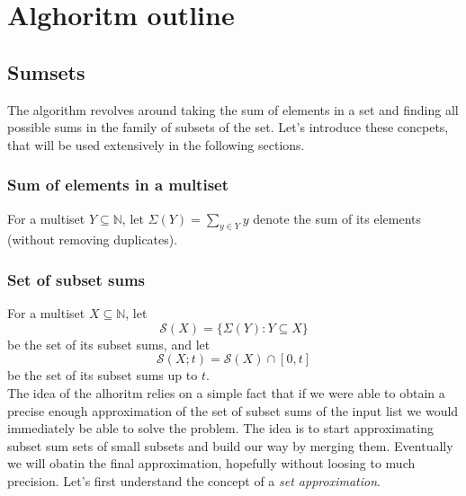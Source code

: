 \section{Alghoritm outline}

\subsection{Sumsets}
The algorithm revolves around taking the sum of elements in a set and finding all possible sums in the family of subsets of the set. Let's introduce these concpets, that will be used extensively in the following sections.
\subsubsection{Sum of elements in a multiset}
For a multiset \( Y \subseteq \mathbb{N} \), let \( \Sigma(Y) = \sum_{y \in Y} y \) denote the sum of its elements (without removing duplicates).
\subsubsection {Set of subset sums}
For a multiset \( X \subseteq \mathbb{N} \), let 
\[ 
    \mathcal{S}(X) = \{ \Sigma(Y) : Y \subseteq X \} 
\] be the set of its subset sums, and let 
\[ 
    \mathcal{S}(X; t) = \mathcal{S}(X) \cap [0, t] 
\] be the set of its subset sums up to \( t \). \\ 

The idea of the alhoritm relies on a simple fact that if we were able to obtain a precise enough approximation of the set of subset sums of the input list we would immediately be able to solve the \Partition problem. The idea is to start approximating subset sum sets of small subsets and build our way by merging them. Eventually we will obatin the final approximation, hopefully without loosing to much precision. Let's first understand the concept of a \textit{set approximation}.

